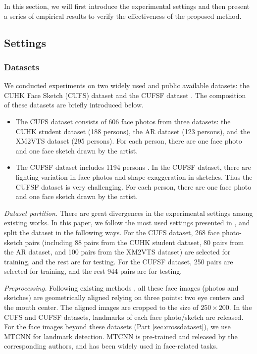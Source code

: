 \documentclass[journal]{IEEEtran}
\begin{document}
In this section, we will first introduce the experimental settings and then present a series of empirical results to verify the effectiveness of the proposed method.  

\subsection{Settings}
\label{sec:settings}

\subsubsection{Datasets}
\label{sec:datasets}

We conducted experiments on two widely used and public available datasets: the CUHK Face Sketch (CUFS) dataset \cite{Ref13} and the CUFSF dataset \cite{Ref31}. The composition of these datasets are briefly introduced below.
\begin{itemize}
\item The CUFS dataset consists of 606 face photos from three datasets: the CUHK student dataset \cite{Ref2} (188 persons), the AR dataset \cite{Ref23} (123 persons), and the XM2VTS dataset \cite{Ref24} (295 persons). For each person, there are one face photo and one face sketch drawn by the artist. 
\item The CUFSF dataset includes 1194 persons \cite{Ref32}. In the CUFSF dataset, there are lighting variation in face photos and shape exaggeration in sketches. Thus the CUFSF dataset is very challenging. For each person, there are one face photo and one face sketch drawn by the artist. 
\end{itemize}

\textit{Dataset partition.} There are great divergences in the experimental settings among existing works. In this paper, we follow the most used settings presented in \cite{Wang2017RSLCR}, and split the dataset in the following ways. For the CUFS dataset, 268 face photo-sketch pairs (including 88 pairs from the CUHK student dataset, 80 pairs from the AR dataset, and 100 pairs from the XM2VTS dataset) are selected for training, and the rest are for testing. For the CUFSF dataset, 250 pairs are selected for training, and the rest 944  pairs are for testing. 

\textit{Preprocessing.} Following existing methods \cite{Wang2017RSLCR}, all these face images (photos and sketches) are geometrically aligned relying on three points: two eye centers and the mouth center. The aligned images are cropped to the size of $250\times{200}$. 
In the CUFS and CUFSF datasets, landmarks of each face photo/sketch are released. For the face images beyond these datasets (Part \ref{sec:crossdataset}), we use MTCNN \cite{Zhang2014MTCNN} for landmark detection. MTCNN is pre-trained and released by the corresponding authors, and has been widely used in face-related tasks. 
\end{document}
